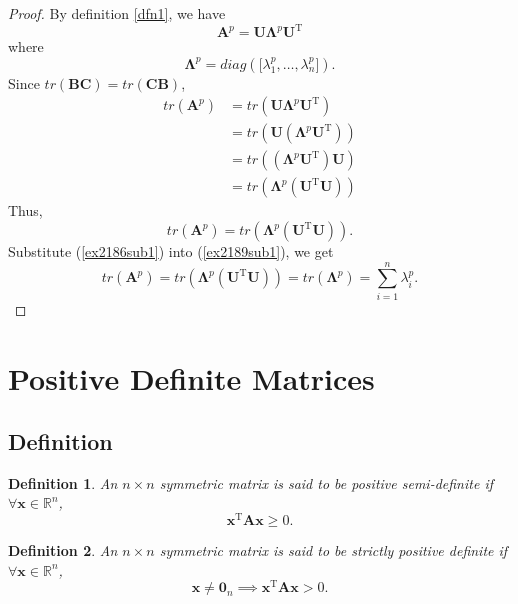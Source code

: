 \documentclass{article}
\theoremstyle{plain}
\newtheorem{dfn}{Definition}[subsection]
\begin{document}
\begin{proof}
	By definition \ref{dfn1}, we have
	\begin{equation}
		\label{ex2189sub0}
		\bm{A}^p = \bm{U} \bm{\Lambda}^p \bm{U}^{\mathrm{T}}
	\end{equation}
	where
	\begin{equation*}
		\bm{\Lambda}^p = diag(\lbrack \lambda_1^p , \ldots , \lambda_n^p \rbrack) .
	\end{equation*}
	Since $tr(\bm{BC}) = tr(\bm{CB})$,
	\begin{equation*}
		\begin{split}
			tr(\bm{A}^p) &= tr(\bm{U} \bm{\Lambda}^p \bm{U}^{\mathrm{T}}) \\
			&= tr(\bm{U} (\bm{\Lambda}^p \bm{U}^{\mathrm{T}})) \\
			&= tr((\bm{\Lambda}^p \bm{U}^{\mathrm{T}}) \bm{U}) \\
			&= tr(\bm{\Lambda}^p (\bm{U}^{\mathrm{T}} \bm{U}))
		\end{split}
	\end{equation*}
	Thus,
	\begin{equation}
		\label{ex2189sub1}
		tr(\bm{A}^p) = tr(\bm{\Lambda}^p (\bm{U}^{\mathrm{T}} \bm{U})) .
	\end{equation}
	Substitute (\ref{ex2186sub1}) into (\ref{ex2189sub1}), we get
	\begin{equation*}
		tr(\bm{A}^p) = tr(\bm{\Lambda}^p (\bm{U}^{\mathrm{T}} \bm{U})) = tr(\bm{\Lambda}^p) = \sum_{i=1}^n \lambda_i^p .
	\end{equation*}
\end{proof}


\section{Positive Definite Matrices}

\subsection{Definition}

\begin{dfn}
	An $n \times n$ symmetric matrix is said to be positive semi-definite
	if $\forall \bm{x} \in \mathbb{R}^n$,
	\begin{equation}
		\label{dfn_semi-definite}
		\bm{x}^{\mathrm{T}} \bm{A} \bm{x} \geq 0 .
	\end{equation}
\end{dfn}

\begin{dfn}
	An $n \times n$ symmetric matrix is said to be strictly positive definite
	if $\forall \bm{x} \in \mathbb{R}^n$,
	\begin{equation}
		\label{dfn_definite}
		\bm{x} \neq \bm{0}_n \implies \bm{x}^{\mathrm{T}} \bm{A} \bm{x} > 0 .
	\end{equation}
\end{dfn}
\end{document}
